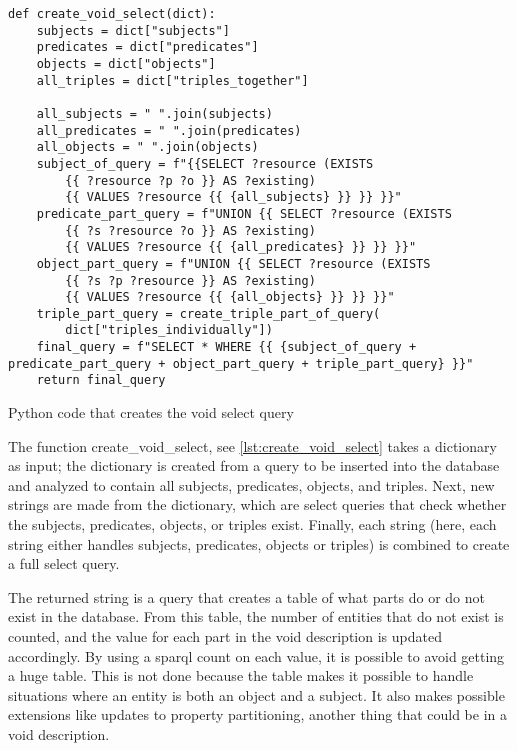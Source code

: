 \begin{listing}[htb!]
    \begin{verbatim}
def create_void_select(dict):
    subjects = dict["subjects"]
    predicates = dict["predicates"]
    objects = dict["objects"]
    all_triples = dict["triples_together"]

    all_subjects = " ".join(subjects)
    all_predicates = " ".join(predicates)
    all_objects = " ".join(objects)
    subject_of_query = f"{{SELECT ?resource (EXISTS 
        {{ ?resource ?p ?o }} AS ?existing) 
        {{ VALUES ?resource {{ {all_subjects} }} }} }}"
    predicate_part_query = f"UNION {{ SELECT ?resource (EXISTS 
        {{ ?s ?resource ?o }} AS ?existing)
        {{ VALUES ?resource {{ {all_predicates} }} }} }}"
    object_part_query = f"UNION {{ SELECT ?resource (EXISTS
        {{ ?s ?p ?resource }} AS ?existing) 
        {{ VALUES ?resource {{ {all_objects} }} }} }}"
    triple_part_query = create_triple_part_of_query(
        dict["triples_individually"])
    final_query = f"SELECT * WHERE {{ {subject_of_query + predicate_part_query + object_part_query + triple_part_query} }}"
    return final_query
    \end{verbatim}
    \caption{Python code that creates the \gls{void} select query}
    \label{lst:create_void_select}
\end{listing}

The function create_void_select, see \autoref{lst:create_void_select} takes a dictionary as input; the dictionary is created from a query to be inserted into the database and analyzed to contain all subjects, predicates, objects, and triples. Next, new strings are made from the dictionary, which are select queries that check whether the subjects, predicates, objects, or triples exist. Finally, each string (here, each string either handles subjects, predicates, objects or triples) is combined to create a full select query.

The returned string is a query that creates a table of what parts do or do not exist in the database. From this table, the number of entities that do not exist is counted, and the value for each part in the \gls{void} description is updated accordingly. By using a \gls{sparql} count on each value, it is possible to avoid getting a huge table. This is not done because the table makes it possible to handle situations where an entity is both an object and a subject. It also makes possible extensions like updates to property partitioning, another thing that could be in a void description.

